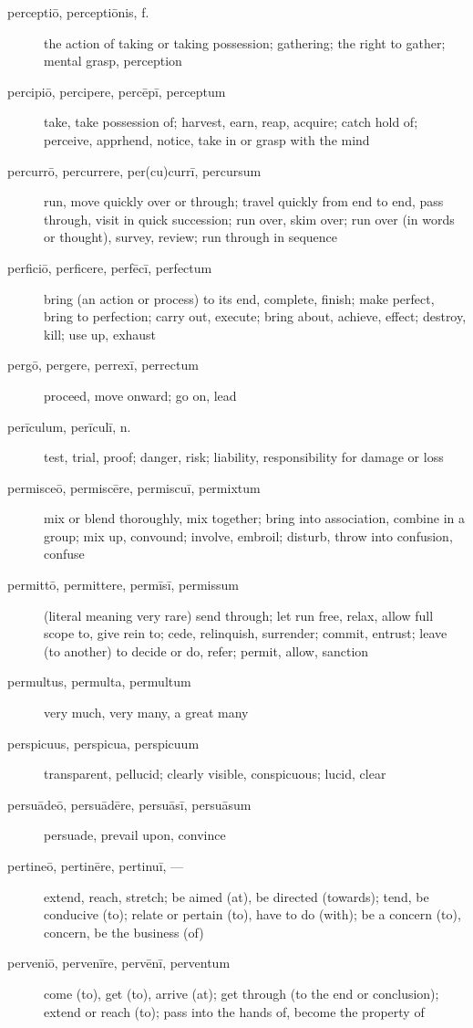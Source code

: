 \begin{description}
    \item[perceptiō, perceptiōnis, f.] the action of taking or taking possession; gathering; the right to gather; mental grasp, perception
    \item[percipiō, percipere, percēpī, perceptum] take, take possession of; harvest, earn, reap, acquire; catch hold of; perceive, apprhend, notice, take in or grasp with the mind
    \item[percurrō, percurrere, per(cu)currī, percursum] run, move quickly over or through; travel quickly from end to end, pass through, visit in quick succession; run over, skim over; run over (in words or thought), survey, review; run through in sequence
    \item[perficiō, perficere, perfēcī, perfectum] bring (an action or process) to its end, complete, finish; make perfect, bring to perfection; carry out, execute; bring about, achieve, effect; destroy, kill; use up, exhaust
    \item[pergō, pergere, perrexī, perrectum] proceed, move onward; go on, lead
    \item[perīculum, perīculī, n.] test, trial, proof; danger, risk; liability, responsibility for damage or loss
    \item[permisceō, permiscēre, permiscuī, permixtum] mix or blend thoroughly, mix together; bring into association, combine in a group; mix up, convound; involve, embroil; disturb, throw into confusion, confuse
    \item[permittō, permittere, permīsī, permissum] (literal meaning very rare) send through; let run free, relax, allow full scope to, give rein to; cede, relinquish, surrender; commit, entrust; leave (to another) to decide or do, refer; permit, allow, sanction
    \item[permultus, permulta, permultum] very much, very many, a great many
    \item[perspicuus, perspicua, perspicuum] transparent, pellucid; clearly visible, conspicuous; lucid, clear
    \item[persuādeō, persuādēre, persuāsī, persuāsum] persuade, prevail upon, convince
    \item[pertineō, pertinēre, pertinuī, ---] extend, reach, stretch; be aimed (at), be directed (towards); tend, be conducive (to); relate or pertain (to), have to do (with); be a concern (to), concern, be the business (of)
    \item[perveniō, pervenīre, pervēnī, perventum] come (to), get (to), arrive (at); get through (to the end or conclusion); extend or reach (to); pass into the hands of, become the property of

\end{description}
